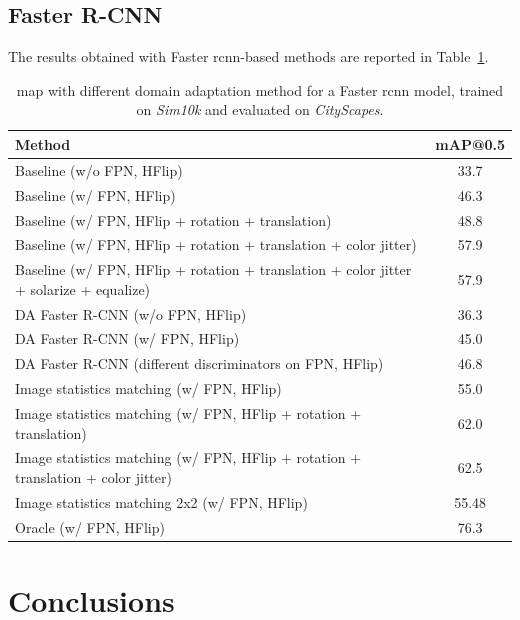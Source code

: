 \documentclass[%
    corpo=12pt,
    twoside,
    stile=classica,   
    tipotesi=magistrale,
    evenboxes,
    english,
	numerazioneromana,
]{toptesi}
\begin{document}
\section{Faster R-CNN}
The results obtained with Faster \gls{rcnn}-based methods are reported in Table~\ref{table:fasterrcnn}.

\begin{table}[ht!]
	\centering
	\begin{tabularx}{\linewidth}{|X|c|}
		\hline
		Method  &   mAP@0.5 \\
		\hline\hline
		Baseline (w/o FPN, HFlip)       &   33.7\cite{abramov2020simple}   \\
		\hline
		Baseline (w/ FPN, HFlip)       &   46.3   \\
		\hline
		Baseline (w/ FPN, HFlip + rotation + translation)       &   48.8   \\
		\hline
		Baseline (w/ FPN, HFlip + rotation + translation + color jitter)       &   57.9  \\
		\hline
		Baseline (w/ FPN, HFlip + rotation + translation + color jitter + solarize + equalize)       &   57.9   \\
		\hline
		DA Faster R-CNN (w/o FPN, HFlip)    & 36.3     \\
		\hline
		DA Faster R-CNN (w/ FPN, HFlip)    & 45.0     \\
 		\hline
 		DA Faster R-CNN (different discriminators on FPN, HFlip)     &   46.8    \\
		\hline
		Image statistics matching (w/ FPN, HFlip)  &   55.0    \\
		\hline
		Image statistics matching (w/ FPN, HFlip + rotation + translation) &   62.0    \\
		\hline
		Image statistics matching (w/ FPN, HFlip + rotation + translation + color jitter) &   62.5    \\
		\hline\hline
		Image statistics matching 2x2 (w/ FPN, HFlip) &   55.48    \\
		\hline\hline
		Oracle (w/ FPN, HFlip) &   76.3    \\
		\hline
	\end{tabularx}
	\caption{\gls{map} with different domain adaptation method for a Faster \gls{rcnn} model, trained on \textit{Sim10k} and evaluated on \textit{CityScapes}.}
	\label{table:fasterrcnn}
\end{table}

\chapter{Conclusions}


\backmatter
\english
\printbibliography[heading=bibintoc]

\end{document}
